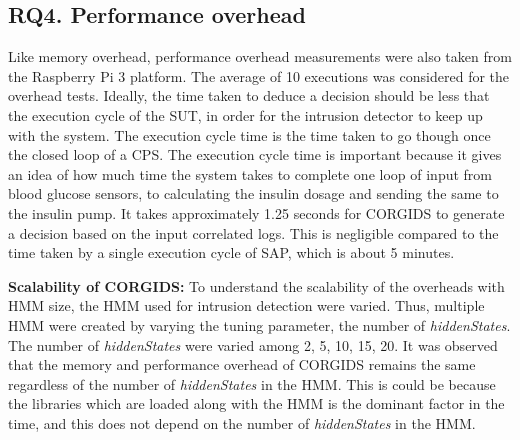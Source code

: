 \subsection{RQ4. Performance overhead}
Like memory overhead, performance overhead measurements were also taken from the Raspberry Pi 3 platform. The average of 10 executions was considered for the overhead tests.  
Ideally, the time taken to deduce a decision should be less that the execution cycle of the \ac{SUT}, in order for the intrusion detector to keep up with the system. The execution cycle time is the time taken to go though once the closed loop of a \ac{CPS}. The execution cycle time is important because it gives an idea of how much time the system takes to complete one loop of input from blood glucose sensors, to calculating the insulin dosage and sending the same to the insulin pump. It takes approximately 1.25 seconds for \ac{CORGIDS} to generate a decision based on the input correlated logs. This is negligible compared to the time taken by a single execution cycle of \ac{SAP}, which is about 5 minutes.

\bigskip
\textbf{Scalability of CORGIDS:} To understand the scalability of the overheads with \ac{HMM} size, the \ac{HMM} used for intrusion detection were varied. Thus, multiple \ac{HMM} were created by varying the tuning parameter, the number of \textit{hiddenStates}. The number of \textit{hiddenStates} were varied among {2, 5, 10, 15, 20}. It was observed that the memory and performance overhead of \ac{CORGIDS} remains the same regardless of the number of \textit{hiddenStates} in the \ac{HMM}. This is could be because the libraries which are loaded along with the \ac{HMM} is the dominant factor in the time, and this does not depend on the number of \textit{hiddenStates} in the \ac{HMM}.

